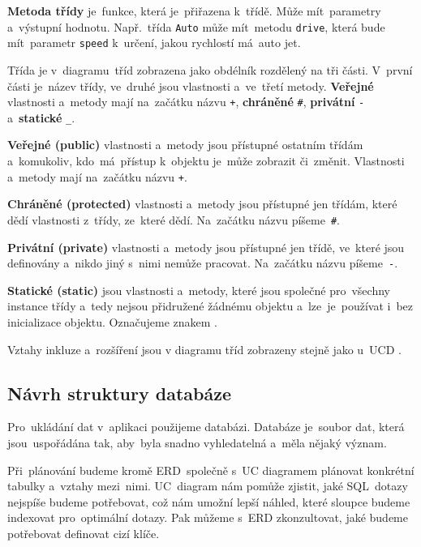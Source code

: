 \documentclass[14pt,a4paper]{article}
\begin{document}
        \textbf{Metoda třídy} je~funkce, která je~přiřazena k~třídě. Může mít~parametry a~výstupní hodnotu. Např.~třída \texttt{Auto} může mít~metodu \texttt{drive}, která bude mít~parametr \texttt{speed} k~určení, jakou rychlostí má~auto jet.
        
        Třída je v~diagramu~tříd zobrazena jako obdélník rozdělený na tři části. V~první části je~název třídy, ve~druhé jsou vlastnosti a~ve~třetí metody. \textbf{Veřejné} vlastnosti a~metody mají na~začátku názvu \texttt{+}, \textbf{chráněné} \texttt{\#}, \textbf{privátní} \texttt{-} a~\textbf{statické} \texttt{\_}.
        
        \textbf{Veřejné (public)} vlastnosti a~metody jsou přístupné ostatním třídám a~komukoliv, kdo~má~přístup k~objektu je~může zobrazit či~změnit. Vlastnosti a~metody mají na~začátku názvu \texttt{+}.

        \textbf{Chráněné (protected)} vlastnosti a~metody jsou přístupné jen třídám, které dědí vlastnosti z~třídy, ze~které dědí. Na~začátku názvu píšeme~\texttt{\#}.
        
        \textbf{Privátní (private)} vlastnosti a~metody jsou přístupné jen třídě, ve~které jsou definovány a~nikdo jiný s~nimi nemůže pracovat. Na~začátku názvu píšeme~\texttt{-}.
        
        \textbf{Statické (static)} jsou vlastnosti a~metody, které jsou společné pro~všechny instance třídy a~tedy nejsou přidružené žádnému objektu a~lze~je~používat i~bez inicializace objektu. Označujeme znakem \texttt{\textunderscore}.
        
        Vztahy inkluze a~rozšíření jsou v diagramu tříd zobrazeny stejně jako u~\textsc{UCD} \parencite{visualparadigmClassDiagram}.

        \subsection{Návrh struktury databáze}
        Pro~ukládání dat v~aplikaci použijeme databázi. Databáze je~soubor dat, která jsou~uspořádána tak, aby~byla snadno vyhledatelná a~měla nějaký význam.

        Při~plánování budeme kromě ERD~společně s~UC diagramem plánovat konkrétní tabulky a~vztahy mezi~nimi. UC~diagram nám pomůže zjistit, jaké SQL~dotazy nejspíše budeme potřebovat, což nám umožní lepší náhled, které sloupce budeme indexovat pro~optimální dotazy.
        Pak můžeme s~ERD zkonzultovat, jaké budeme potřebovat definovat cizí klíče.
\end{document}
